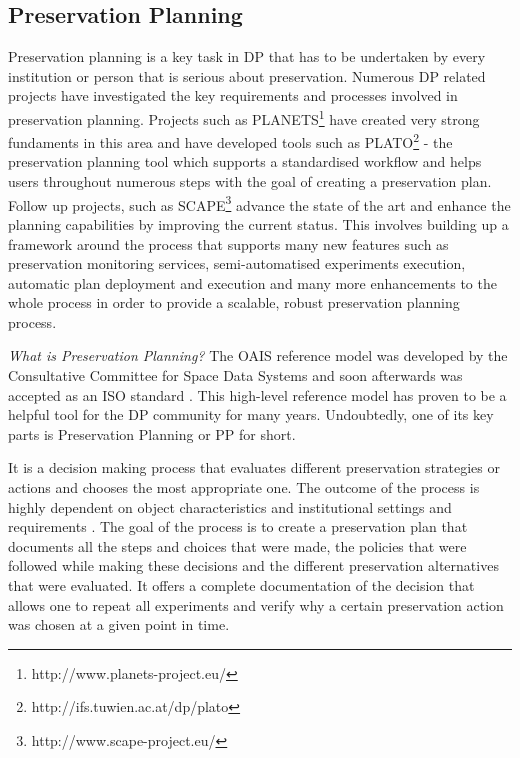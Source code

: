 \subsection{Preservation Planning}
\label{lbl:preservationplanning}
Preservation planning is a key task in DP that has to be undertaken by every institution or person that is serious about preservation. Numerous DP related projects have investigated the key requirements and processes involved in preservation planning. Projects such as PLANETS\footnote{http://www.planets-project.eu/} have created very strong fundaments in this area and have developed tools such as PLATO\footnote{http://ifs.tuwien.ac.at/dp/plato} - the preservation planning tool which supports a standardised workflow and helps users throughout numerous steps with the goal of creating a preservation plan. Follow up projects, such as SCAPE\footnote{http://www.scape-project.eu/} advance the state of the art and enhance the planning capabilities by improving the current status. This involves building up a framework around the process that supports many new features such as preservation monitoring services, semi-automatised experiments execution, automatic plan deployment and execution and many more enhancements to the whole process in order to provide a scalable, robust preservation planning process.\newline

\noindent\textit{What is Preservation Planning?}\newline
The OAIS reference model was developed by the Consultative Committee for Space Data Systems and soon afterwards was accepted as an ISO standard \cite{iso:2003:oais}. This high-level reference model has proven to be a helpful tool for the DP community for many years. Undoubtedly, one of its key parts is Preservation Planning or PP for short.

It is a decision making process that evaluates different preservation strategies or actions and chooses the most appropriate one. The outcome of the process is highly dependent on object characteristics and institutional settings and requirements \cite{STR07_jcdl}. The goal of the process is to create a preservation plan that documents all the steps and choices that were made, the policies that were followed while making these decisions and the different preservation alternatives that were evaluated. It offers a complete documentation of the decision that allows one to repeat all experiments and verify why a certain preservation action was chosen at a given point in time.

